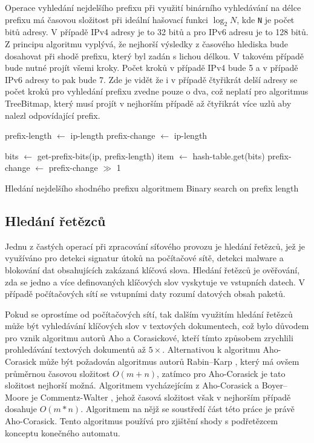 Operace vyhledání nejdelšího prefixu při využití binárního vyhledávání na délce prefixu má časovou
složitost při ideální hašovací funkci $\log_2{N}$, kde \texttt{N} je počet bitů adresy. V případě IPv4 adresy je to 32 bitů a pro IPv6
adresu je to 128 bitů. Z principu algoritmu vyplývá, že nejhorší výsledky z časového hlediska bude dosahovat
při shodě prefixu, který byl zadán s lichou délkou. V takovém případě bude nutné projít všemi kroky.
Počet kroků v případě IPv4 bude 5 a v případě IPv6 adresy to pak bude 7.
Zde je vidět že i v případě čtyřikrát delší adresy se počet kroků pro vyhledání prefixu zvedne pouze o dva,
což neplatí pro algoritmus TreeBitmap, který musí projít v nejhorším případě až čtyřikrát více
uzlů aby nalezl odpovídající prefix.
\cite{bspl}

\begin{algorithm}
	prefix-length $\leftarrow$ ip-length\;
	prefix-change $\leftarrow$ ip-length\;
	{
		bits $\leftarrow$ get-prefix-bits(ip, prefix-length)\;
		item $\leftarrow$ hash-table.get(bits)\;
		prefix-change $\leftarrow$ prefix-change $\gg$ 1\;

	}
	\caption{Hledání nejdelšího shodného prefixu algoritmem Binary search on prefix length}
\end{algorithm}

\subsection{Hledání řetězců} %

Jednu z častých operací při zpracování síťového provozu je hledání řetězců, jež je využíváno pro detekci
signatur útoků na počítačové sítě, detekci malware a blokování dat obsahujících zakázaná klíčová slova.
Hledání řetězců je ověřování, zda se jedno a více definovaných klíčových slov vyskytuje ve vstupních
datech. V případě počítačových sítí se vstupními daty rozumí datových obsah paketů.

Pokud se oprostíme od počítačových sítí, tak dalším využitím hledání řetězců může být
vyhledávání klíčových slov v textových dokumentech, což bylo důvodem pro vznik
algoritmu autorů Aho a Corasickové, kteří tímto způsobem zrychlili prohledávání
textových dokumentů až $5\times$. Alternativou k algoritmu Aho-Corasick může být požadován
algoritmus autorů Rabin–Karp \cite{rabin-karp}, který má ovšem průměrnou časovou složitost $O(m+n)$,
zatímco pro Aho-Corasick je tato složitost nejhorší možná. Algoritmem vycházejícím z Aho-Corasick
a Boyer–Moore \cite{boyer-moore}
je Commentz-Walter \cite{walter}, jehož časová složitost však v nejhorším případě dosahuje $O(m*n)$.
Algoritmem na nějž se soustředí část této práce je právě Aho-Corasick.
Tento algoritmus používá pro zjištění shody s podřetězcem konceptu konečného automatu.

